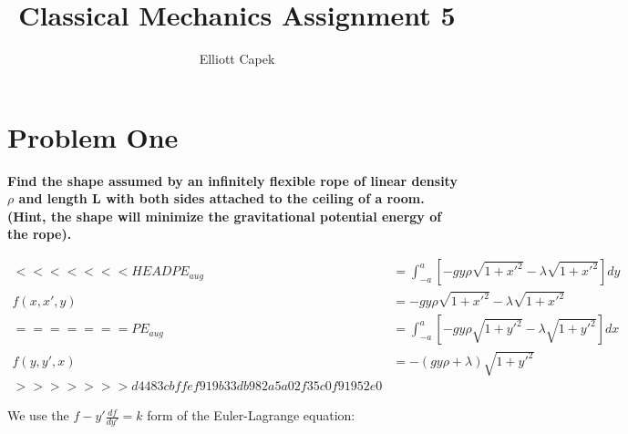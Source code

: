 \documentclass[10pt]{article} %
\title{Classical Mechanics Assignment 5}
\author{Elliott Capek}
\begin{document}
\maketitle{}

\section{Problem One}
\textbf{Find the shape assumed by an infinitely flexible rope of linear density $\rho$ and length L with both sides attached to the ceiling of a room. (Hint, the shape will minimize the gravitational potential energy of the rope).}

\begin{align*}
<<<<<<< HEAD
  PE_{aug} &= \int_{-a}^{a} \left[-gy\rho \sqrt{1 + x'^2} - \lambda\sqrt{1+x'^2}\right]dy\\
  f(x,x',y) &= -gy\rho \sqrt{1 + x'^2} - \lambda\sqrt{1+x'^2}\\
=======
  PE_{aug} &= \int_{-a}^{a} \left[-gy\rho \sqrt{1 + y'^2} - \lambda\sqrt{1+y'^2}\right]dx\\
  f(y,y',x) &= -\left(gy\rho + \lambda\right)\sqrt{1 + y'^2}\\
>>>>>>> d4483cbffef919b33db982a5a02f35c0f91952e0
\end{align*}

We use the $f - y'\frac{df}{dy'} = k$ form of the Euler-Lagrange equation:
\end{document}
